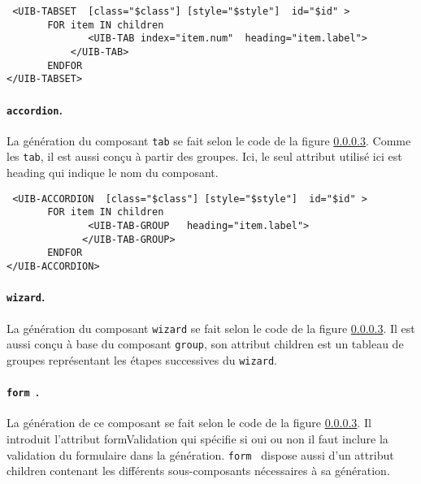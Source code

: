 \documentclass[a4paper,11pt]{report}
\begin{document}
\begin{verbatim}
 <UIB-TABSET  [class="$class"] [style="$style"]  id="$id" >
       FOR item IN children
	          <UIB-TAB index="item.num"  heading="item.label"> 
           </UIB-TAB>
       ENDFOR           
</UIB-TABSET>            
\end{verbatim}

\paragraph{{\tt accordion}.}La génération du composant {\tt tab} se fait selon le code de la figure \ref{}. Comme les {\tt tab}, il est aussi
conçu à partir des groupes. Ici, le seul attribut utilisé ici est \og heading \fg qui indique le nom du composant.
\begin{verbatim}
 <UIB-ACCORDION  [class="$class"] [style="$style"]  id="$id" >
       FOR item IN children
	          <UIB-TAB-GROUP   heading="item.label"> 
             </UIB-TAB-GROUP>
       ENDFOR           
</UIB-ACCORDION>            
\end{verbatim}
\paragraph{{\tt wizard}.}La génération du composant {\tt wizard} se fait selon le code de la figure \ref{}. Il est aussi conçu à base du composant
{\tt group}, son attribut \og children  \fg est un tableau de groupes représentant  les étapes successives du {\tt wizard}.


\paragraph{{\tt form }.}La génération de ce composant se fait selon le code de la figure \ref{}. Il introduit l'attribut \og formValidation \fg qui spécifie si 
oui ou non il faut inclure la validation du formulaire dans la génération. {\tt form } dispose aussi d'un attribut \og children \fg contenant les différents
sous-composants nécessaires à sa génération.
\end{document}
